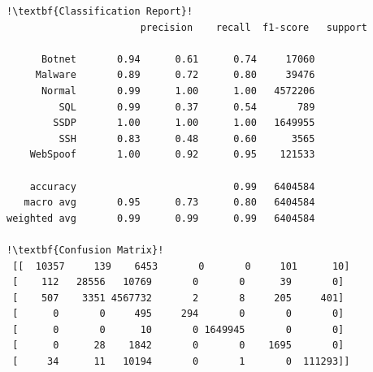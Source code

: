 \begin{appendices}
\begin{lstlisting}[escapechar=!]
!\textbf{Classification Report}!
			           precision    recall  f1-score   support

      Botnet       0.94      0.61      0.74     17060
     Malware       0.89      0.72      0.80     39476
      Normal       0.99      1.00      1.00   4572206
         SQL       0.99      0.37      0.54       789
        SSDP       1.00      1.00      1.00   1649955
         SSH       0.83      0.48      0.60      3565
    WebSpoof       1.00      0.92      0.95    121533

    accuracy                           0.99   6404584
   macro avg       0.95      0.73      0.80   6404584
weighted avg       0.99      0.99      0.99   6404584
    
!\textbf{Confusion Matrix}!    
 [[  10357     139    6453       0       0     101      10]
 [    112   28556   10769       0       0      39       0]
 [    507    3351 4567732       2       8     205     401]
 [      0       0     495     294       0       0       0]
 [      0       0      10       0 1649945       0       0]
 [      0      28    1842       0       0    1695       0]
 [     34      11   10194       0       1       0  111293]]
\end{lstlisting}


\end{appendices}
